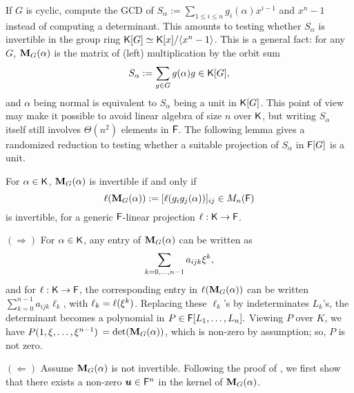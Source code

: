If $G$ is cyclic, \cite{GatGie90} compute the GCD of $S_\alpha := \sum_{1 \leq i \leq n} g_i(\alpha)x^{i-1}$
and $x^n-1$ instead of computing a determinant. This amounts to testing whether $S_\alpha$ is
invertible in the group ring ${\mathsf{K}}[G]\simeq{\mathsf{K}}[x]/\langle x^n-1\rangle$. This is a general fact: for any $G$,
$\mat M_G(\alpha)$ is the matrix of (left) multiplication by the orbit
sum
$$S_\alpha:= \sum_{g \in G} g(\alpha)g \in {\mathsf{K}}[G],$$ and $\alpha$ being
normal is equivalent to $S_\alpha$ being a unit in ${\mathsf{K}}[G]$. This point of
view may make it possible to avoid linear algebra of size $n$ over ${\mathsf{K}}$,
but writing $S_\alpha$ itself still involves $\Theta(n^2)$ elements in
${\mathsf{F}}$. The following lemma
gives a randomized reduction to testing whether a suitable projection of
$S_\alpha$ in ${\mathsf{F}}[G]$ is a unit.
 


\begin{lemma}
  \label{Lem:Proj}
  For $\alpha \in {\mathsf{K}}$, $\mat M_G(\alpha)$ is invertible if and only
  if $$\ell(\mat M_G(\alpha)) := [\ell(g_ig_j(\alpha))]_{ij} \in M_n(\F)$$
  is invertible, for a generic ${\mathsf{F}}$-linear projection $\ell: {\mathsf{K}} \to {\mathsf{F}}$.
\end{lemma}
  $(\Rightarrow)$ For  $\alpha\in{\mathsf{K}}$, any entry of
  $\mat M_G(\alpha)$ can be written as
  \begin{equation}\label{Eq:PrimElm}
    \sum_{k= 0,\dots,n-1} a_{ijk}\xi^k,
  \end{equation}
  and for $\ell: {\mathsf{K}} \to {\mathsf{F}}$, the corresponding entry in $\ell(\mat
  M_G(\alpha))$ can be written $\sum_{k= 0}^{n-1} a_{ijk}\ell_k$, with
  $\ell_k = \ell(\xi^k)$. Replacing these $\ell_k$'s by
  indeterminates $L_k$'s, the determinant becomes a polynomial in $P
  \in {\mathsf{F}}[L_1, \ldots, L_n].$ Viewing $P$ over $K$, we
  have $ P(1, \xi, \ldots, \xi^{n-1})$ $= \det(\mat M_G(\alpha))$,
  which is non-zero by assumption; so, $P$ is not zero.
  
  $(\Leftarrow)$ Assume $\mat M_G(\alpha)$ is not invertible. Following the
  proof of \cite[Lemma 4]{Jam18}, we first show that there exists a
  non-zero $\boldsymbol{u} \in {\mathsf{F}}^n$ in the kernel of $\mat M_G(\alpha)$.
  
